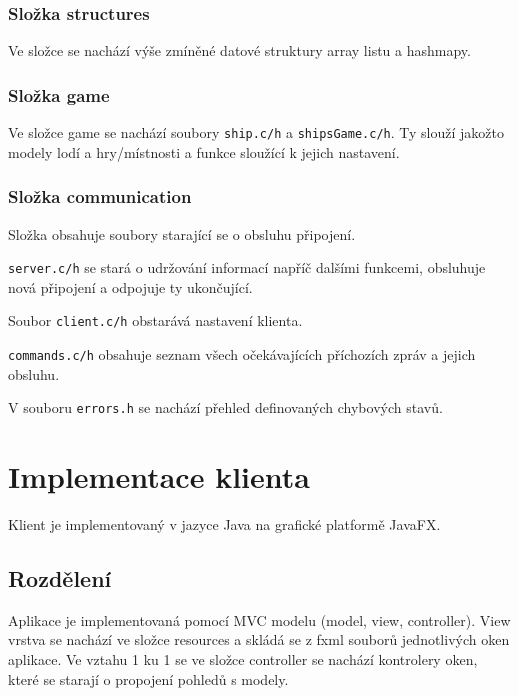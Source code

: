 \documentclass[12pt, a4paper]{article} %
\begin{document}
	\subsubsection{Složka structures}
	\par Ve složce se nachází výše zmíněné datové struktury array listu a hashmapy.
	
	\subsubsection{Složka game}
	\par Ve složce game se nachází soubory \texttt{ship.c/h} a \texttt{shipsGame.c/h}. Ty slouží jakožto modely lodí a hry/místnosti a funkce sloužící k jejich nastavení.
	
	\subsubsection{Složka communication}
	\par Složka obsahuje soubory starající se o obsluhu připojení.\\
	\par \texttt{server.c/h} se stará o udržování informací napříč dalšími funkcemi,  obsluhuje nová připojení a odpojuje ty ukončující.
	\par Soubor \texttt{client.c/h} obstarává nastavení klienta.
	\par \texttt{commands.c/h} obsahuje seznam všech očekávajících příchozích zpráv a jejich obsluhu.
	\par V souboru \texttt{errors.h} se nachází přehled definovaných chybových stavů.	
	
	\section{Implementace klienta}
	\par Klient je implementovaný v jazyce Java na grafické platformě JavaFX.
	\subsection{Rozdělení}
	\par Aplikace je implementovaná pomocí MVC modelu (model, view, controller). 
	View vrstva se nachází ve složce resources a skládá se z fxml souborů jednotlivých oken aplikace. Ve vztahu 1 ku 1  se ve složce controller se nachází kontrolery oken, které se starají o propojení pohledů s modely.\\
	
\end{document}
